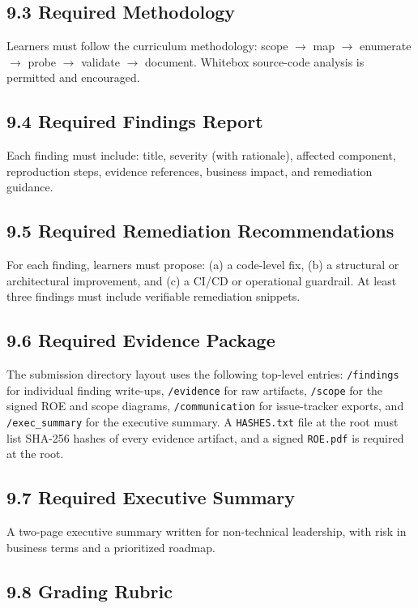 \documentclass[11pt,letterpaper,oneside]{report}
\newcommand{\tool}[1]{\texttt{\small #1}}
\begin{document}
\subsection*{9.3 Required Methodology}
Learners must follow the curriculum methodology: scope $\to$ map $\to$ enumerate $\to$ probe $\to$ validate $\to$ document. Whitebox source-code analysis is permitted and encouraged.

\subsection*{9.4 Required Findings Report}
Each finding must include: title, severity (with rationale), affected component, reproduction steps, evidence references, business impact, and remediation guidance.

\subsection*{9.5 Required Remediation Recommendations}
For each finding, learners must propose: (a) a code-level fix, (b) a structural or architectural improvement, and (c) a CI/CD or operational guardrail. At least three findings must include verifiable remediation snippets.

\subsection*{9.6 Required Evidence Package}
The submission directory layout uses the following top-level entries: \tool{/findings} for individual finding write-ups, \tool{/evidence} for raw artifacts, \tool{/scope} for the signed ROE and scope diagrams, \tool{/communication} for issue-tracker exports, and \tool{/exec\_summary} for the executive summary. A \tool{HASHES.txt} file at the root must list SHA-256 hashes of every evidence artifact, and a signed \tool{ROE.pdf} is required at the root.

\subsection*{9.7 Required Executive Summary}
A two-page executive summary written for non-technical leadership, with risk in business terms and a prioritized roadmap.

\subsection*{9.8 Grading Rubric}
\end{document}
